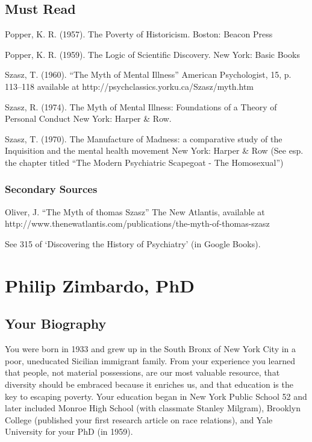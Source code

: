 \begin{refsection}
\section{Must Read}
\label{mustread}

Popper, K. R. (1957). The Poverty of Historicism. Boston: Beacon Press

Popper, K. R. (1959). The Logic of Scientific Discovery. New York: Basic Books

Szasz, T. (1960). “The Myth of Mental Illness” American Psychologist, 15, p. 113--118 available at http:\slash \slash psychclassics.yorku.ca\slash Szasz\slash myth.htm

Szasz, R. (1974). The Myth of Mental Illness: Foundations of a Theory of Personal Conduct New York: Harper \& Row.

Szasz, T. (1970). The Manufacture of Madness: a comparative study of the Inquisition and the mental health movement New York: Harper \& Row (See esp. the chapter titled “The Modern Psychiatric Scapegoat - The Homosexual”)

\subsection{Secondary Sources}
\label{secondarysources}

Oliver, J. “The Myth of thomas Szasz” The New Atlantis, available at http:\slash \slash www.thenewatlantis.com\slash publications\slash the-myth-of-thomas-szasz

See 315 of `Discovering the History of Psychiatry' (in Google Books).

\chapter{Philip Zimbardo, PhD}
\label{philipzimbardophd}

\section{Your Biography}
\label{yourbiography}

You were born in 1933 and grew up in the South Bronx of New York City in a poor, uneducated Sicilian immigrant family. From your experience you learned that people, not material possessions, are our most valuable resource, that diversity should be embraced because it enriches us, and that education is the key to escaping poverty. Your education began in New York Public School 52 and later included Monroe High School (with classmate Stanley Milgram), Brooklyn College (published your first research article on race relations), and Yale University for your PhD (in 1959).


\end{refsection}
